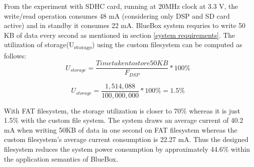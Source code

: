 From the experiment with SDHC card, running at 20MHz clock at 3.3 V, the write/read operation consumes 48 mA (considering only DSP and SD card active) and in standby it consumes 22 mA. BlueBox system requries to write 50 KB of data every second as mentioned in section \ref{system requirements}. The utilization of storage(U\textsubscript{storage}) using the custom filesystem can be computed as follows:
 \[U_{storage} = \frac{Time taken to store 50 KB}{
	F_{DSP}
} * 100 \%\]

 \[U_{storage} = \frac{1,514,088}{
	100,000,000
} * 100 \% = 1.5\%\]

 With FAT filesystem, the storage utilization is closer to 70\% whereas it is just 1.5\% with the custom file system.
 The system draws an average current of 40.2 mA when writing 50KB of data in one second on FAT filesystem whereas the custom filesystem's average current consumption is 22.27 mA. Thus the designed filesystem reduces the system power consumption by approximately 44.6\% within the application semantics of BlueBox. 
 
